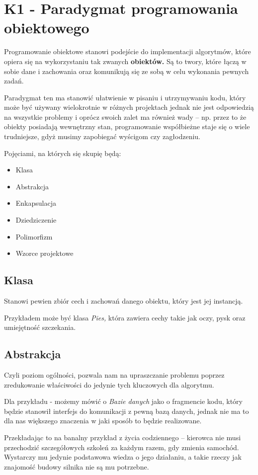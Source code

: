 \section{K1 - Paradygmat programowania obiektowego}

Programowanie obiektowe stanowi podejście do implementacji algorytmów, które opiera się na wykorzystaniu tak zwanych \textbf{obiektów.} Są to twory, które łączą w sobie dane i zachowania oraz komunikują się ze sobą w celu wykonania pewnych zadań.

Paradygmat ten ma stanowić ułatwienie w pisaniu i utrzymywaniu kodu, który może być używany wielokrotnie w różnych projektach jednak nie jest odpowiedzią na wszystkie problemy i oprócz swoich zalet ma również wady -- np. przez to że obiekty posiadają wewnętrzny stan, programowanie współbieżne staje się o wiele trudniejsze, gdyż musimy zapobiegać wyścigom czy zagłodzeniu.

Pojęciami, na których się skupię będą:
\begin{itemize}
	\item Klasa
	\item Abstrakcja
	\item Enkapsulacja
	\item Dziedziczenie
	\item Polimorfizm
	\item Wzorce projektowe
\end{itemize}

\subsection{Klasa}
Stanowi pewien zbiór cech i zachowań danego obiektu, który jest jej instancją.

Przykładem może być klasa \textit{Pies,} która zawiera cechy takie jak oczy, pysk oraz umiejętność szczekania.

\subsection{Abstrakcja}
Czyli poziom ogólności, pozwala nam na upraszczanie problemu poprzez zredukowanie właściwości do jedynie tych kluczowych dla algorytmu.

Dla przykładu - możemy mówić o \textit{Bazie danych} jako o fragmencie kodu, który będzie stanowił interfejs do komunikacji z pewną bazą danych, jednak nie ma to dla nas większego znaczenia w jaki sposób to będzie realizowane.

Przekładając to na banalny przykład z życia codziennego -- kierowca nie musi przechodzić szczegółowych szkoleń za każdym razem, gdy zmienia samochód.
Wystarczy mu jedynie podstawowa wiedza o jego działaniu, a takie rzeczy jak znajomość budowy silnika nie są mu potrzebne.

